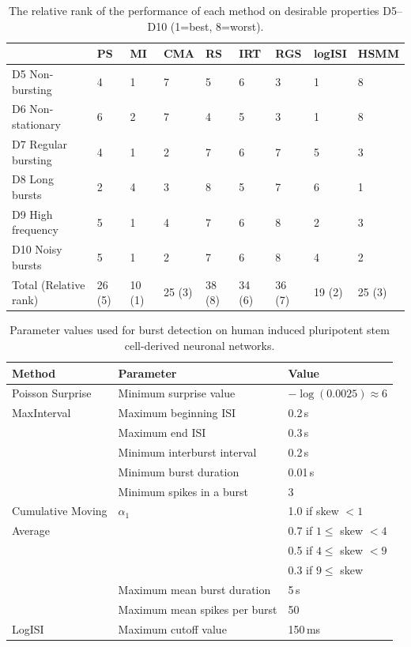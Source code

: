\documentclass[12pt, titlepage]{article}
\begin{document}
				\clearpage
				\begin{table}
					\centering \begin{tabular}{|l|llllllll|}
						\hline
						& PS & MI & CMA & RS & IRT & RGS & logISI & HSMM
						\\ \hline  D5 Non-bursting & 4 & 1 & 7 & 5 & 6 & 3 & 1 &  8
						\\D6 Non-stationary & 6 & 2 & 7 & 4 & 5 & 3 & 1 & 8 
						\\ D7 Regular bursting & 4 & 1 & 2 & 7 & 6 & 7 & 5 & 3
						\\ D8 Long bursts & 2 & 4 & 3 & 8 & 5 & 7 & 6 & 1
						\\D9 High frequency & 5 & 1 & 4 & 7 & 6 & 8 & 2 & 3
						\\ D10 Noisy bursts & 5 & 1 & 2 & 7 & 6 & 8 & 4 & 2
						\\ \hline  Total (Relative rank) & 26 (5) & 10 (1) & 25 (3) & 38 (8) & 34 (6) & 36 (7) & 19 (2) & 25 (3)
						\\ \hline
					\end{tabular}
					\caption{The relative rank of the performance of each method on desirable properties D5--D10 (1=best, 8=worst).} \label{des_results2}
				\end{table}	
				\clearpage
				\begin{table}[h]
					\centering
					\begin{tabular}{|l|l|l|}
						\hline
						Method & Parameter & Value
						\\ \hline 	
						 Poisson Surprise  & Minimum surprise value & $-\log(0.0025) \approx 6$\\ \hline 
						MaxInterval & Maximum beginning ISI & 0.2$\,$s
						\\ & Maximum end ISI & 0.3$\,$s
						\\ & Minimum interburst interval & 0.2$\,$s
						\\ & Minimum burst duration & 0.01$\,$s
						\\ & Minimum spikes in a burst & 3
						\\ \hline
						Cumulative Moving & $\alpha_1$ & 1.0 if skew $<1$
						\\ Average & &  0.7  if $1 \leq $ skew $<4$
						\\  & & 0.5  if $4 \leq $ skew $<9$
						\\  & & 0.3  if  $9 \leq$ skew 
						\\  & Maximum mean burst duration & 5$\,$s
						\\  & Maximum mean spikes per burst & 50
						\\ \hline 
						LogISI & Maximum cutoff value & 150$\,$ms
						\\ \hline
						
					\end{tabular}
					\caption{Parameter values used for burst detection on human induced pluripotent stem cell-derived neuronal networks.}
					\label{param_vals_hum}
				\end{table}	
			
		\clearpage
	
\end{document}
